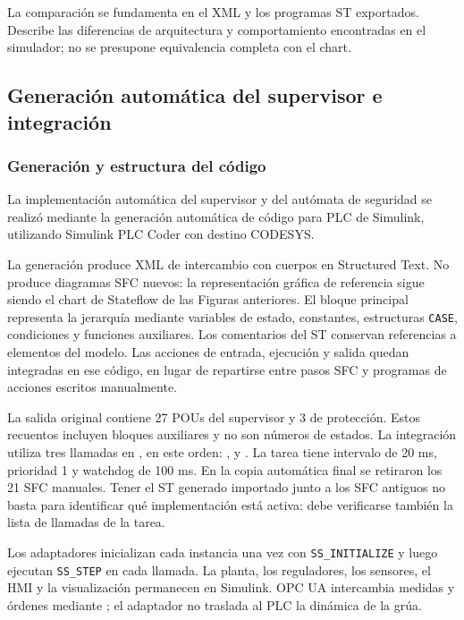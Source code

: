 \documentclass[a4paper,10pt,onecolumn,journal]{ieeeconf}
\numberwithin{equation}{section}
\begin{document}
La comparación se fundamenta en el XML y los programas ST exportados. Describe las diferencias de arquitectura y comportamiento encontradas en el simulador; no se presupone equivalencia completa con el chart.


\subsection{Generación automática del supervisor e integración}
\label{subsec:sup_generado_codesys}
\subsubsection{Generación y estructura del código}
La implementación automática del supervisor y del autómata de seguridad se realizó mediante la generación automática de código para PLC de Simulink, utilizando Simulink PLC Coder con destino CODESYS.

La generación produce XML de intercambio con cuerpos en Structured Text. No produce diagramas SFC nuevos: la representación gráfica de referencia sigue siendo el chart de Stateflow de las Figuras anteriores. El bloque principal  representa la jerarquía mediante variables de estado, constantes, estructuras \texttt{CASE}, condiciones y funciones auxiliares. Los comentarios del ST conservan referencias a elementos del modelo. Las acciones de entrada, ejecución y salida quedan integradas en ese código, en lugar de repartirse entre pasos SFC y programas de acciones escritos manualmente.

La salida original contiene 27 POUs del supervisor y 3 de protección. Estos recuentos incluyen bloques auxiliares y no son números de estados. La integración utiliza tres llamadas en , en este orden: ,  y . La tarea tiene intervalo de 20 ms, prioridad 1 y watchdog de 100 ms. En la copia automática final se retiraron los 21 SFC manuales. Tener el ST generado importado junto a los SFC antiguos no basta para identificar qué implementación está activa: debe verificarse también la lista de llamadas de la tarea.

Los adaptadores inicializan cada instancia una vez con \texttt{SS\_INITIALIZE} y luego ejecutan \texttt{SS\_STEP} en cada llamada. La planta, los reguladores, los sensores, el HMI y la visualización permanecen en Simulink. OPC UA intercambia medidas y órdenes mediante ; el adaptador no traslada al PLC la dinámica de la grúa.
\end{document}
